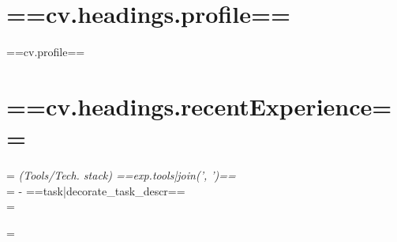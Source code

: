 \documentclass[]{CV-JuanCamiloFlorez}
\begin{document}
\begin{minipage}[t]{0.66\textwidth} 


\section{==cv.headings.profile==}
==cv.profile==

\sectionsep

\section{==cv.headings.recentExperience==}
=%
    \textit{(Tools/Tech. stack) ==exp.tools|join(', ')==} \\
    =%
    - ==task|decorate_task_descr== \\
    =%
    \sectionsep

=%
\vspace{\topsep} %





\end{minipage}
\end{document}
